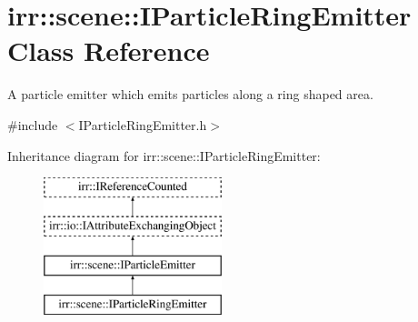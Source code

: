 \hypertarget{classirr_1_1scene_1_1IParticleRingEmitter}{}\section{irr\+:\+:scene\+:\+:I\+Particle\+Ring\+Emitter Class Reference}
\label{classirr_1_1scene_1_1IParticleRingEmitter}


A particle emitter which emits particles along a ring shaped area.  




{\ttfamily \#include $<$I\+Particle\+Ring\+Emitter.\+h$>$}

Inheritance diagram for irr\+:\+:scene\+:\+:I\+Particle\+Ring\+Emitter\+:\begin{figure}[H]
\begin{center}
\leavevmode
\includegraphics[height=4.000000cm]{classirr_1_1scene_1_1IParticleRingEmitter}
\end{center}
\end{figure}
